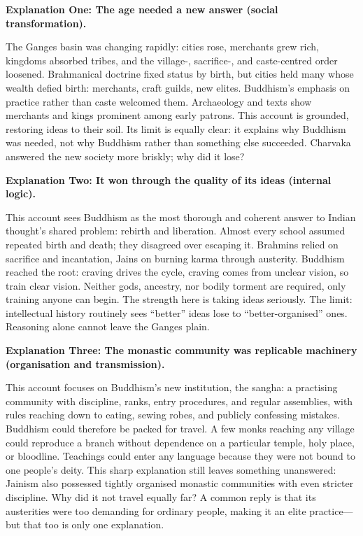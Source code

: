 \textbf{Explanation One: The age needed a new answer (social transformation).}

The Ganges basin was changing rapidly: cities rose, merchants grew rich, kingdoms absorbed tribes, and the village-, sacrifice-, and caste-centred order loosened. Brahmanical doctrine fixed status by birth, but cities held many whose wealth defied birth: merchants, craft guilds, new elites. Buddhism's emphasis on practice rather than caste welcomed them. Archaeology and texts show merchants and kings prominent among early patrons. This account is grounded, restoring ideas to their soil. Its limit is equally clear: it explains why Buddhism was needed, not why Buddhism rather than something else succeeded. Charvaka answered the new society more briskly; why did it lose?

\textbf{Explanation Two: It won through the quality of its ideas (internal logic).}

This account sees Buddhism as the most thorough and coherent answer to Indian thought's shared problem: rebirth and liberation. Almost every school assumed repeated birth and death; they disagreed over escaping it. Brahmins relied on sacrifice and incantation, Jains on burning karma through austerity. Buddhism reached the root: craving drives the cycle, craving comes from unclear vision, so train clear vision. Neither gods, ancestry, nor bodily torment are required, only training anyone can begin. The strength here is taking ideas seriously. The limit: intellectual history routinely sees ``better'' ideas lose to ``better-organised'' ones. Reasoning alone cannot leave the Ganges plain.

\textbf{Explanation Three: The monastic community was replicable machinery (organisation and transmission).}

This account focuses on Buddhism's new institution, the sangha: a practising community with discipline, ranks, entry procedures, and regular assemblies, with rules reaching down to eating, sewing robes, and publicly confessing mistakes. Buddhism could therefore be packed for travel. A few monks reaching any village could reproduce a branch without dependence on a particular temple, holy place, or bloodline. Teachings could enter any language because they were not bound to one people's deity. This sharp explanation still leaves something unanswered: Jainism also possessed tightly organised monastic communities with even stricter discipline. Why did it not travel equally far? A common reply is that its austerities were too demanding for ordinary people, making it an elite practice---but that too is only one explanation.

